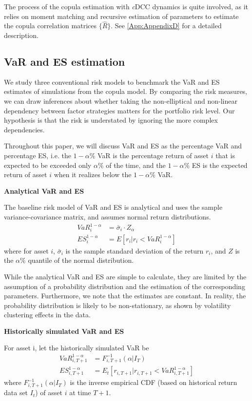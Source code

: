The process of the copula estimation with \textit{c}DCC dynamics is quite involved, as it relies on moment matching and recursive estimation of parameters to estimate the copula correlation matrices $\{\hat{R}\}$. See \autoref{App:AppendixD} for a detailed description.

\subsection{VaR and ES estimation}
We study three conventional risk models to benchmark the VaR and ES estimates of simulations from the copula model. By comparing the risk measures, we can draw inferences about whether taking the non-elliptical and non-linear dependency between factor strategies matters for the portfolio risk level. Our hypothesis is that the risk is understated by ignoring the more complex dependencies.

Throughout this paper, we will discuss VaR and ES as the percentage VaR and percentage ES, i.e. the $1-\alpha \%$ VaR is the percentage return of asset $i$ that is expected to be exceeded only $\alpha \%$ of the time, and the $1 -\alpha \%$ ES is the expected return of asset $i$ when it realizes below the $1 - \alpha \%$ VaR.

\textbf{Analytical VaR and ES}

The baseline risk model of VaR and ES is analytical and uses the sample variance-covariance matrix, and assumes normal return distributions.
\begin{align}
    VaR_i^{1-\alpha} &= \bar{\sigma}_i \cdot Z_{\alpha} \\
    ES_i^{1-\alpha} &= E[r_i | r_i < VaR_i^{1-\alpha}]
\end{align}
where for asset $i$, $\bar{\sigma}_i$ is the sample standard deviation of the return $r_i$, and $Z$ is the $\alpha \%$ quantile of the normal distribution.

While the analytical VaR and ES are simple to calculate, they are limited by the assumption of a probability distribution and the estimation of the corresponding parameters. Furthermore, we note that the estimates are constant. In reality, the probability distribution is likely to be non-stationary, as shown by volatility clustering effects in the data.

\textbf{Historically simulated VaR and ES}

For asset i, let the historically simulated VaR be
\begin{align}
    VaR_{i,T+1}^{1-\alpha} &= F_{i, T+1}^{-1}(\alpha | I_T) \\
    ES_{i, T+1}^{1 - \alpha} &= E_t[r_{i,T+1} | r_{i,T+1} < VaR_{i,T+1}^{1-\alpha}]
\end{align}
where $F_{i, T+1}^{-1}(\alpha | I_T)$ is the inverse empirical CDF (based on historical return data set $I_t$) of asset $i$ at time $T+1$.

